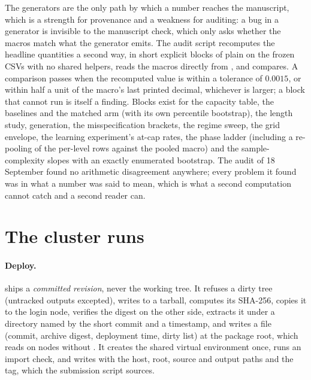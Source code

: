 The generators are the only path by which a number reaches the manuscript, which is a
strength for provenance and a weakness for auditing: a bug in a generator is invisible to
the manuscript check, which only asks whether the macros match what the generator emits.
The audit script recomputes the headline quantities a second way, in short explicit
blocks of plain  on the frozen CSVs with no shared helpers, reads the
macros directly from , and compares. A comparison
passes when the recomputed value is within a tolerance of $0.0015$, or within half a unit
of the macro's last printed decimal, whichever is larger; a block that cannot run is
itself a finding. Blocks exist for the capacity table, the baselines and the matched
arm (with its own percentile bootstrap), the length study, generation, the
misspecification brackets, the regime sweep, the grid envelope, the learning
experiment's at-cap rates, the phase ladder (including a re-pooling of the per-level rows
against the pooled macro) and the sample-complexity slopes with an exactly enumerated
bootstrap. The audit of 18 September found no arithmetic disagreement anywhere; every
problem it found was in what a number was said to mean, which is what a second
computation cannot catch and a second reader can.

\section{The cluster runs}
\label{sec:hpc}

\paragraph{Deploy.}  ships a \emph{committed revision}, never
the working tree. It refuses a dirty tree (untracked outputs excepted), writes
 to a tarball, computes its SHA-256, copies it to the login node,
verifies the digest on the other side, extracts it under a directory named by the short
commit and a timestamp, and writes a  file (commit, archive digest,
deployment time, dirty list) at the package root, which  reads on
nodes without . It creates the shared virtual environment once, runs an import
check, and writes  with the host, root, source and output
paths and the tag, which the submission script sources.

